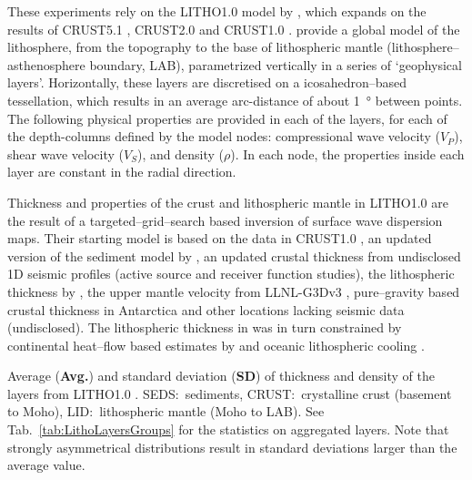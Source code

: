These experiments rely on the {LITHO1.0} model by \textcite{Pasyanos2014}, which expands on the results of CRUST5.1 \parencite{Mooney1998_Crust51}, CRUST2.0 \parencite{Bassin2000Crust20} and CRUST1.0 \parencite{Laske2012Crust10}.
\Textcite{Pasyanos2014} provide a global model of the lithosphere, from the topography to the base of lithospheric mantle (lithosphere--asthenosphere boundary, LAB), parametrized vertically in a series of `geophysical layers'.
Horizontally, these layers are discretised on a icosahedron--based tessellation, which results in an average arc-distance of about \SI{1}{\degree} between points.
The following physical properties are provided in each of the layers, for each of the depth-columns defined by the model nodes: compressional wave velocity ($V_{P}$), shear wave velocity ($V_{S}$), and density ($\rho$).
In each node, the properties inside each layer are constant in the radial direction.

Thickness and properties of the crust and lithospheric mantle in {LITHO1.0} are the result of a targeted--grid--search based inversion of surface wave dispersion maps.
Their starting model is based on the data in {CRUST1.0} \parencite{Laske2012Crust10}, an updated version of the sediment model by \textcite{Laske1997_sediments}, an updated crustal thickness from undisclosed 1D seismic profiles (active source and receiver function studies), the lithospheric thickness by \textcite{Pasyanos2005}, the upper mantle velocity from {LLNL-G3Dv3} \parencite{Simmons2012_LLNL}, pure--gravity based crustal thickness in Antarctica \parencite{Block2009} and other locations lacking seismic data (undisclosed).
The lithospheric thickness in \textcite{Pasyanos2005} was in turn constrained by continental heat--flow based estimates by \textcite{Artemieva2006} and oceanic lithospheric cooling \parencite{Turcotte1982_geodynamics}.

\begin{table}
    \caption[Thickness and density of the layers from {LITHO1.0}.]{
        Average (\textbf{Avg.}) and standard deviation (\textbf{SD}) of thickness and density of the layers from {LITHO1.0} \parencite{Pasyanos2014}.
        {SEDS}:~sediments,
        {CRUST}:~crystalline crust (basement to Moho),
        {LID}:~lithospheric mantle (Moho to LAB).
        See Tab.~\ref{tab:LithoLayersGroups} for the statistics on aggregated layers.
        Note that strongly asymmetrical distributions result in standard deviations larger than the average value.
    }
    \begin{adjustbox}{center}
        
    \end{adjustbox}
    \label{tab:LithoLayers}
\end{table}

